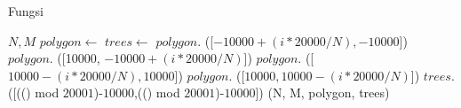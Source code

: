 \begin{algorithm}
    \caption{Fungsi }
	\label{psdo:pembangkit-kasus-uji}
    \begin{algorithmic}[1]
        \Require $N, M$
        \State $polygon \leftarrow$ 
        \State $trees \leftarrow$ 
        	\State $polygon.$ ([$-10000+(i*20000/N), -10000$])
		\EndFor
        	\State $polygon.$ ([10000, $-10000+(i*20000/N)$])
		\EndFor
        	\State $polygon.$ ([$10000-(i*20000/N), 10000$])
		\EndFor
        	\State $polygon.$ ([$10000, 10000-(i*20000/N)$])
		\EndFor
        	\State $trees.$ ([(() mod $20001$)-$10000$,(() mod $20001$)-$10000$])
		\EndFor
		\State \Return (N, M, polygon, trees)
	\end{algorithmic}
\end{algorithm}